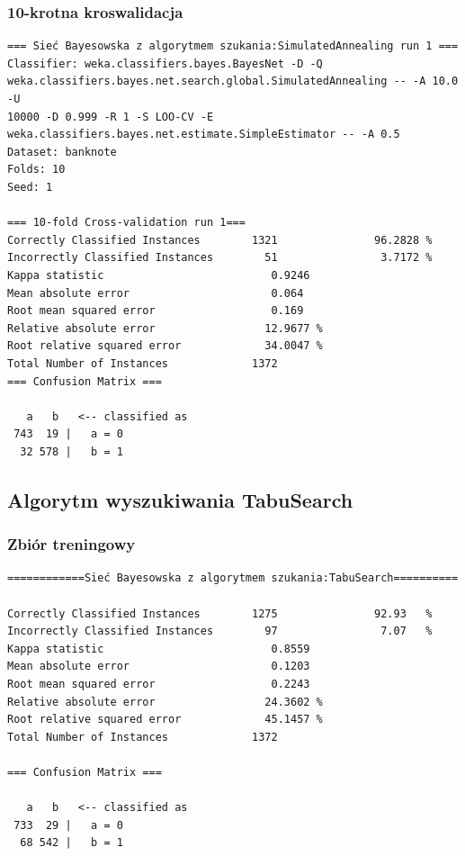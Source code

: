 \documentclass{classrep}
\begin{document}
\subsubsection*{10-krotna kroswalidacja}
\scriptsize 
\begin{verbatim}
=== Sieć Bayesowska z algorytmem szukania:SimulatedAnnealing run 1 ===
Classifier: weka.classifiers.bayes.BayesNet -D -Q
weka.classifiers.bayes.net.search.global.SimulatedAnnealing -- -A 10.0 -U
10000 -D 0.999 -R 1 -S LOO-CV -E weka.classifiers.bayes.net.estimate.SimpleEstimator -- -A 0.5
Dataset: banknote
Folds: 10
Seed: 1

=== 10-fold Cross-validation run 1===
Correctly Classified Instances        1321               96.2828 %
Incorrectly Classified Instances        51                3.7172 %
Kappa statistic                          0.9246
Mean absolute error                      0.064 
Root mean squared error                  0.169 
Relative absolute error                 12.9677 %
Root relative squared error             34.0047 %
Total Number of Instances             1372     
=== Confusion Matrix ===

   a   b   <-- classified as
 743  19 |   a = 0
  32 578 |   b = 1
\end{verbatim} 
\normalsize

\subsection{Algorytm wyszukiwania TabuSearch}
\subsubsection*{Zbiór treningowy}
\scriptsize 
\begin{verbatim}
============Sieć Bayesowska z algorytmem szukania:TabuSearch==========

Correctly Classified Instances        1275               92.93   %
Incorrectly Classified Instances        97                7.07   %
Kappa statistic                          0.8559
Mean absolute error                      0.1203
Root mean squared error                  0.2243
Relative absolute error                 24.3602 %
Root relative squared error             45.1457 %
Total Number of Instances             1372     

=== Confusion Matrix ===

   a   b   <-- classified as
 733  29 |   a = 0
  68 542 |   b = 1
\end{verbatim} 
\normalsize
\end{document}
